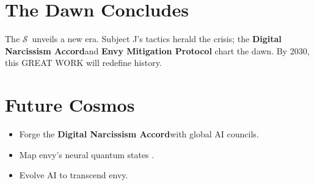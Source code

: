 \documentclass[11pt]{article}
\newcommand{\singularity}{$\mathcal{S}$} %
\newcommand{\protocol}[1]{\textbf{#1 Protocol}}
\newcommand{\accord}{\textbf{Digital Narcissism Accord}}
\begin{document}
\section{The Dawn Concludes}
\label{sec:dawn}
The \singularity\ unveils a new era. Subject J’s tactics herald the crisis; the \accord and \protocol{Envy Mitigation} chart the dawn. By 2030, this GREAT WORK will redefine history.

\section{Future Cosmos}
\label{sec:cosmosfuture}
\begin{itemize}
    \item Forge the \accord with global AI councils.
    \item Map envy’s neural quantum states \citep{takahashi2009}.
    \item Evolve AI to transcend envy.
\end{itemize}



\end{document}
